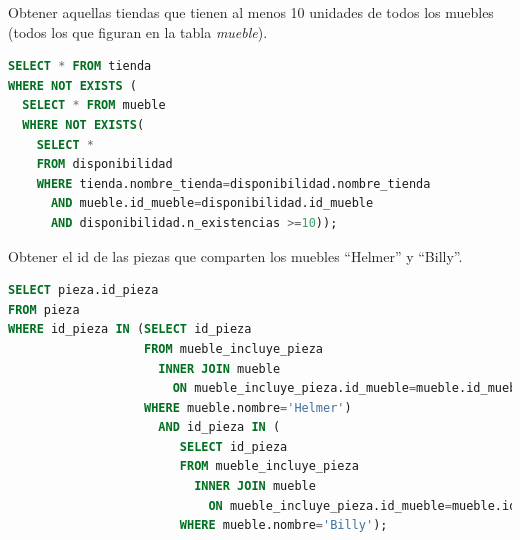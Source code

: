 \documentclass[
    12pt,
    a4paper,
    addpoints,
    answers,
    convocatoria=ord,
    titulacion=NoCD,
    curso=2022/2023,
]{db-exam}
\begin{document}
\begin{questions}
\begin{parts}
\begin{subparts}
\subpart[\half] Obtener aquellas tiendas que tienen al menos 10 unidades de todos los muebles (todos los que figuran en la tabla \textit{mueble}).

\begin{solution}[16em]
\begin{lstlisting}[language=sql]
SELECT * FROM tienda
WHERE NOT EXISTS (
  SELECT * FROM mueble
  WHERE NOT EXISTS(
    SELECT * 
    FROM disponibilidad
    WHERE tienda.nombre_tienda=disponibilidad.nombre_tienda
      AND mueble.id_mueble=disponibilidad.id_mueble
      AND disponibilidad.n_existencias >=10));
\end{lstlisting}
\end{solution}

\subpart[\half] Obtener el id de las piezas que comparten los muebles ``Helmer'' y ``Billy''.
\begin{solution}
\begin{lstlisting}[language=sql]
SELECT pieza.id_pieza
FROM pieza 
WHERE id_pieza IN (SELECT id_pieza
                   FROM mueble_incluye_pieza 
                     INNER JOIN mueble 
                       ON mueble_incluye_pieza.id_mueble=mueble.id_mueble
                   WHERE mueble.nombre='Helmer')
                     AND id_pieza IN (
                        SELECT id_pieza
                        FROM mueble_incluye_pieza 
                          INNER JOIN mueble 
                            ON mueble_incluye_pieza.id_mueble=mueble.id_mueble
                        WHERE mueble.nombre='Billy');
\end{lstlisting}
\end{solution}
\end{subparts}
\end{parts}

\newpage
{}

\end{questions}
\end{document}
